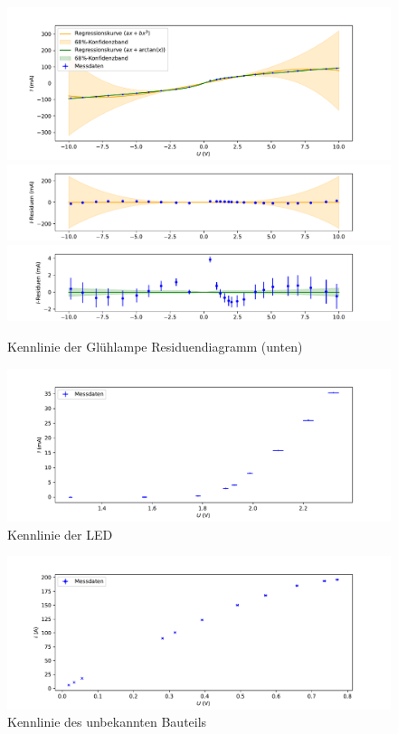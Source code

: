 \documentclass[parskip, 12pt, DIV=16, openany]{scrartcl}
\begin{document}
\begin{figure}
\includegraphics[width=\linewidth]{plot2}%
\vspace*{-1.28cm}\\ %
\includegraphics[width=\linewidth]{plot2residuen1}
\vspace*{-1.38cm}\\ %
\includegraphics[width=\linewidth]{plot2residuen2}
\caption{Kennlinie der Glühlampe Residuendiagramm (unten)}\label{fig2}
\end{figure}

\begin{figure}
\includegraphics[width=\linewidth]{plot3}%
\caption{Kennlinie der LED}\label{fig3}
\end{figure}
\begin{figure}
\includegraphics[width=\linewidth]{plot4}%

\caption{Kennlinie des unbekannten Bauteils}\label{fig4}
\end{figure}
\end{document}
